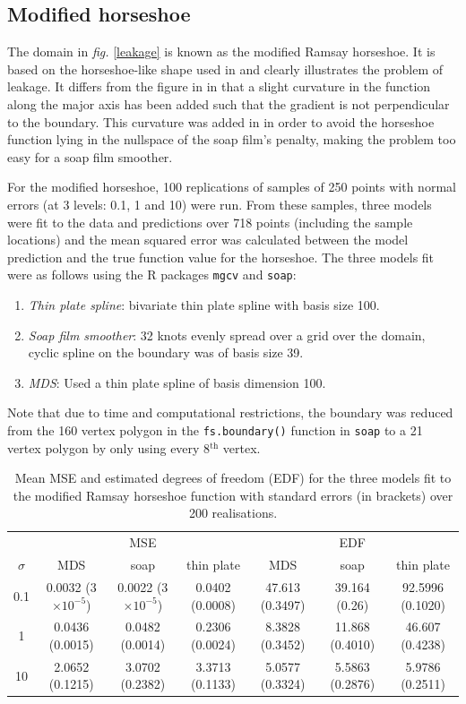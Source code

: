 \documentclass[a4paper,10pt]{article}
\newcommand{\fig}[1]{\emph{fig.} \ref{#1}}
\newcommand{\cross}{\times}
\begin{document}
\subsection{Modified horseshoe}

The domain in \fig{leakage} is known as the modified Ramsay horseshoe. It is based on the horseshoe-like shape used in \cite{ramsay} and clearly illustrates the problem of leakage. It differs from the figure in \cite{ramsay} in that a slight curvature in the function along the major axis has been added such that the gradient is not perpendicular to the boundary. This curvature was added in \cite{soap}  in order to avoid the horseshoe function lying in the nullspace of the soap film's penalty, making the problem too easy for a soap film smoother.

For the modified horseshoe, 100 replications of samples of 250 points with normal errors (at 3 levels: 0.1, 1 and 10) were run. From these samples, three models were fit to the data and predictions over 718 points (including the sample locations) and the mean squared error was calculated between the model prediction and the true function value for the horseshoe. The three models fit were as follows using the \textsf{R} packages \texttt{mgcv} and \texttt{soap}:

\begin{enumerate}
\item \emph{Thin plate spline}: bivariate thin plate spline with basis size 100.
\item \emph{Soap film smoother}: 32 knots evenly spread over a grid over the domain, cyclic spline on the boundary was of basis size 39.
\item \emph{MDS}: Used a thin plate spline of basis dimension 100.
\end{enumerate} 

Note that due to time and computational restrictions, the boundary was reduced from the 160 vertex polygon in the \texttt{fs.boundary()} function in \texttt{soap} to a 21 vertex polygon by only using every 8$^\text{th}$ vertex.

\begin{table}[ht]
\centering
\begin{tabular}{c || c c c | c c c}
 & & MSE & &  & EDF & \\ 
$\sigma$ & MDS & soap & thin plate & MDS & soap & thin plate\\ 
\hline
0.1  & 0.0032 (3$\cross10^{-5}$) & 0.0022 (3$\cross10^{-5}$) & 0.0402 (0.0008) & 47.613 (0.3497) & 39.164 (0.26) & 92.5996 (0.1020)\\ 
1  & 0.0436 (0.0015) & 0.0482 (0.0014) & 0.2306 (0.0024) & 8.3828 (0.3452) & 11.868 (0.4010) & 46.607 (0.4238)\\ 
10  & 2.0652 (0.1215) & 3.0702 (0.2382) & 3.3713 (0.1133) & 5.0577 (0.3324) & 5.5863 (0.2876) & 5.9786 (0.2511)\\ 
\end{tabular}
\caption{Mean MSE and estimated degrees of freedom (EDF) for the three models fit to the modified Ramsay horseshoe function with standard errors (in brackets) over 200 realisations.}
\label{ramsayresultstable}
\end{table}
\end{document}
